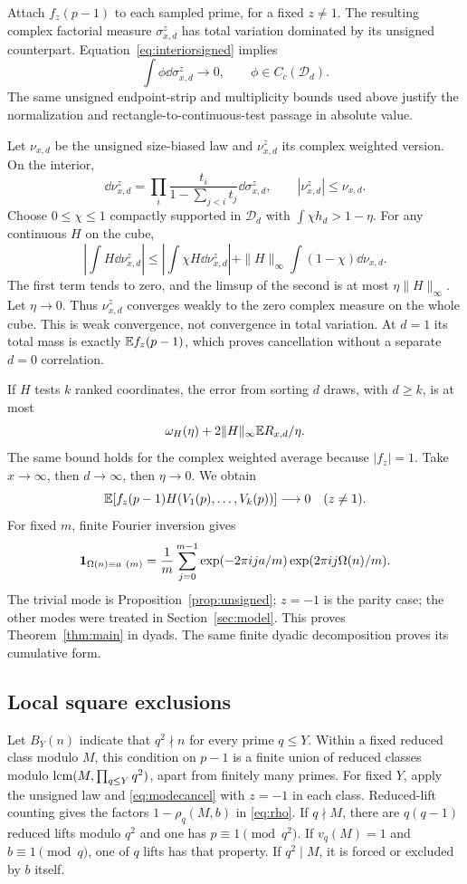 Attach $f_z(p-1)$ to each sampled prime, for a fixed $z\ne1$.
The resulting complex factorial measure $\sigma_{x,d}^{z}$ has
total variation dominated by its unsigned counterpart.
Equation~\eqref{eq:interiorsigned} implies
\[
 \int\phi\dd\sigma_{x,d}^{z}\longrightarrow0,
       \qquad\phi\in C_c(\mathcal D_d).
\]
The same unsigned endpoint-strip and multiplicity bounds used above
justify the normalization and rectangle-to-continuous-test passage
in absolute value.

Let $\nu_{x,d}$ be the unsigned size-biased law and
$\nu_{x,d}^{z}$ its complex weighted version. On the interior,
\[
 \dd\nu_{x,d}^{z}
  =\prod_i\frac{t_i}{1-\sum_{j<i}t_j}\dd\sigma_{x,d}^{z},
 \qquad |\nu_{x,d}^{z}|\leq\nu_{x,d}.
\]
Choose $0\leq\chi\leq1$ compactly supported in $\mathcal D_d$
with $\int\chi h_d>1-\eta$. For any continuous $H$ on the cube,
\[
 \left|\int H\dd\nu_{x,d}^{z}\right|
 \leq\left|\int\chi H\dd\nu_{x,d}^{z}\right|
       +\|H\|_\infty\int(1-\chi)\dd\nu_{x,d}.
\]
The first term tends to zero, and the limsup of the second is at
most $\eta\|H\|_\infty$. Let $\eta\to0$. Thus
$\nu_{x,d}^{z}$ converges weakly to the zero complex measure on
the whole cube. This is weak convergence, not convergence in total
variation. At $d=1$ its total mass is exactly $\mathbb E f_z(p-1)$,
which proves cancellation without a separate $d=0$ correlation.

If $H$ tests $k$ ranked coordinates, the error from sorting $d$
draws, with $d\geq k$, is at most
\[
 \omega_H(\eta)+2\|H\|_\infty\mathbb E R_{x,d}/\eta.
\]
The same bound holds for the complex weighted average because
$|f_z|=1$. Take $x\to\infty$, then $d\to\infty$, then
$\eta\to0$. We obtain
\begin{equation}\label{eq:modecancel}
 \mathbb E[f_z(p-1)H(V_1(p),\ldots,V_k(p))]\longrightarrow0
       \quad(z\ne1).
\end{equation}
For fixed $m$, finite Fourier inversion gives
\[
 \mathbf 1_{\Omega(n)\equiv a\ (m)}
  =\frac1m\sum_{j=0}^{m-1}
       \exp(-2\pi ija/m)\exp(2\pi ij\Omega(n)/m).
\]
The trivial mode is Proposition~\ref{prop:unsigned}; $z=-1$ is
the parity case; the other modes were treated in
Section~\ref{sec:model}. This proves Theorem~\ref{thm:main} in
dyads. The same finite dyadic decomposition proves its cumulative
form.

\subsection{Local square exclusions}

Let $B_Y(n)$ indicate that $q^2\nmid n$ for every prime $q\leq Y$.
Within a fixed reduced class modulo $M$, this condition on $p-1$
is a finite union of reduced classes modulo
$\operatorname{lcm}(M,\prod_{q\leq Y}q^2)$, apart from finitely many primes.
For fixed $Y$, apply the unsigned law and \eqref{eq:modecancel}
with $z=-1$ in each class. Reduced-lift counting gives the factors
$1-\rho_q(M,b)$ in \eqref{eq:rho}.
If $q\nmid M$, there are $q(q-1)$ reduced lifts modulo $q^2$
and one has $p\equiv1\pmod{q^2}$. If $v_q(M)=1$ and
$b\equiv1\pmod q$, one of $q$ lifts has that property. If
$q^2\mid M$, it is forced or excluded by $b$ itself.

